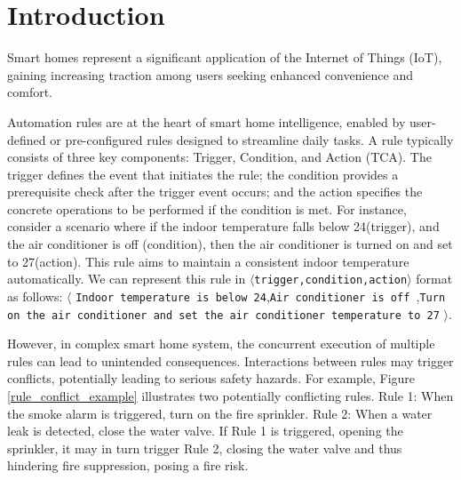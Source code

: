 \section{Introduction}

Smart homes represent a significant application of the Internet of Things (IoT), gaining increasing traction among users seeking enhanced convenience and comfort.

Automation rules are at the heart of smart home intelligence, enabled by user-defined or pre-configured rules designed to streamline daily tasks. A rule typically consists of three key components: Trigger, Condition, and Action (TCA). The trigger defines the event that initiates the rule; the condition provides a prerequisite check after the trigger event occurs; and the action specifies the concrete operations to be performed if the condition is met. For instance, consider a scenario where if the indoor temperature falls below 24\celsius (trigger), and the air conditioner is off (condition), then the air conditioner is turned on and set to 27\celsius (action). This rule aims to maintain a consistent indoor temperature automatically. We can represent this rule in $\langle$\texttt{trigger,condition,action}$\rangle$ format as follows: $\langle$ \texttt{Indoor temperature is below 24\celsius },\texttt{Air conditioner is off },\texttt{Turn on the air conditioner and set the air conditioner temperature to 27\celsius } $\rangle$.

However, in complex smart home system, the concurrent execution of multiple rules can lead to unintended consequences. Interactions between rules may trigger conflicts, potentially leading to serious safety hazards. For example, Figure \ref{rule_conflict_example} illustrates two potentially conflicting rules. Rule 1: When the smoke alarm is triggered, turn on the fire sprinkler. Rule 2: When a water leak is detected, close the water valve. If Rule 1 is triggered, opening the sprinkler, it may in turn trigger Rule 2, closing the water valve and thus hindering fire suppression, posing a fire risk.


